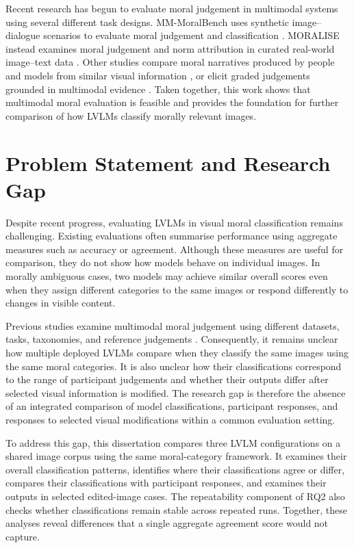 Recent research has begun to evaluate moral judgement in multimodal systems
using several different task designs. MM-MoralBench uses synthetic
image--dialogue scenarios to evaluate moral judgement and classification
\cite{yan2026mmmoralbench}. MORALISE instead examines moral judgement and norm
attribution in curated real-world image--text data
\cite{lin2026moralise}. Other studies compare moral narratives produced by
people and models from similar visual information
\cite{rezapour2025tales}, or elicit graded judgements grounded in multimodal
evidence \cite{park2026mmscale}. Taken together, this work shows that
multimodal moral evaluation is feasible and provides the foundation for
further comparison of how LVLMs classify morally relevant images.

\section{Problem Statement and Research Gap}

Despite recent progress, evaluating LVLMs in visual moral classification
remains challenging. Existing evaluations often summarise performance using
aggregate measures such as accuracy or agreement. Although these measures are
useful for comparison, they do not show how models behave on individual
images. In morally ambiguous cases, two models may achieve similar overall
scores even when they assign different categories to the same images or
respond differently to changes in visible content.

Previous studies examine multimodal moral judgement using different datasets,
tasks, taxonomies, and reference judgements
\cite{yan2026mmmoralbench,lin2026moralise,rezapour2025tales,park2026mmscale}.
Consequently, it remains unclear how multiple deployed LVLMs compare when they
classify the same images using the same moral categories. It is also unclear
how their classifications correspond to the range of participant judgements
and whether their outputs differ after selected visual information is
modified. The research gap is therefore the absence of an integrated
comparison of model classifications, participant responses, and responses to
selected visual modifications within a common evaluation setting.

To address this gap, this dissertation compares three LVLM configurations on
a shared image corpus using the same moral-category framework. It examines
their overall classification patterns, identifies where their classifications agree or
differ, compares their classifications with participant responses, and
examines their outputs in selected edited-image cases. The repeatability
component of RQ2 also checks whether classifications remain stable across repeated
runs. Together, these analyses reveal differences that a single aggregate
agreement score would not capture.

